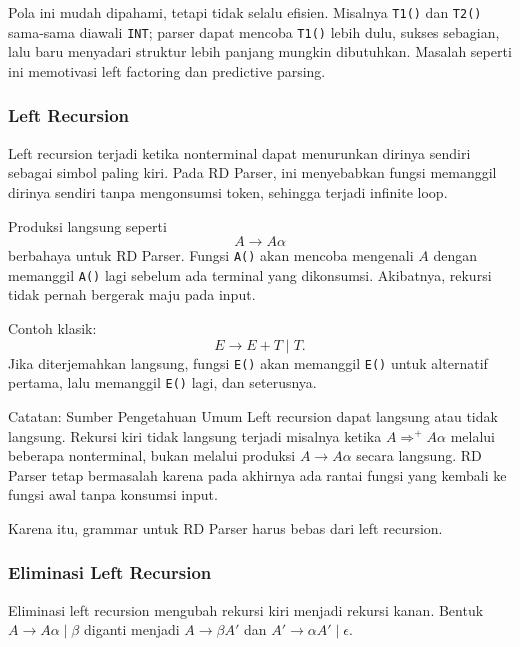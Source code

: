 Pola ini mudah dipahami, tetapi tidak selalu efisien. Misalnya \texttt{T1()} dan \texttt{T2()} sama-sama diawali \texttt{INT}; parser dapat mencoba \texttt{T1()} lebih dulu, sukses sebagian, lalu baru menyadari struktur lebih panjang mungkin dibutuhkan. Masalah seperti ini memotivasi left factoring dan predictive parsing.

\subsubsection{Left Recursion}

\begin{jawab}
Left recursion terjadi ketika nonterminal dapat menurunkan dirinya sendiri sebagai simbol paling kiri. Pada RD Parser, ini menyebabkan fungsi memanggil dirinya sendiri tanpa mengonsumsi token, sehingga terjadi infinite loop.
\end{jawab}

Produksi langsung seperti
\[
    A\rightarrow A\alpha
\]
berbahaya untuk RD Parser. Fungsi \texttt{A()} akan mencoba mengenali $A$ dengan memanggil \texttt{A()} lagi sebelum ada terminal yang dikonsumsi. Akibatnya, rekursi tidak pernah bergerak maju pada input.

Contoh klasik:
\[
    E\rightarrow E+T \mid T.
\]
Jika diterjemahkan langsung, fungsi \texttt{E()} akan memanggil \texttt{E()} untuk alternatif pertama, lalu memanggil \texttt{E()} lagi, dan seterusnya.

\begin{cmt}{Catatan: Sumber Pengetahuan Umum}{}
Left recursion dapat langsung atau tidak langsung. Rekursi kiri tidak langsung terjadi misalnya ketika $A\Rightarrow^+ A\alpha$ melalui beberapa nonterminal, bukan melalui produksi $A\rightarrow A\alpha$ secara langsung. RD Parser tetap bermasalah karena pada akhirnya ada rantai fungsi yang kembali ke fungsi awal tanpa konsumsi input.
\end{cmt}

Karena itu, grammar untuk RD Parser harus bebas dari left recursion.

\subsubsection{Eliminasi Left Recursion}

\begin{jawab}
Eliminasi left recursion mengubah rekursi kiri menjadi rekursi kanan. Bentuk $A\rightarrow A\alpha\mid\beta$ diganti menjadi $A\rightarrow\beta A'$ dan $A'\rightarrow\alpha A'\mid\epsilon$.
\end{jawab}

